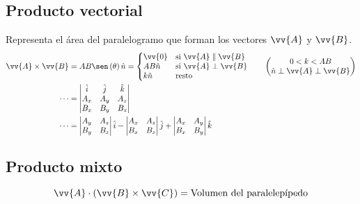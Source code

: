 \documentclass[a4paper, 8pt]{extarticle}
\renewcommand{\vec}[1]{\vv{{#1}}}
\begin{document}
\begin{multicols}{3}
  \subsection{Producto vectorial}
  Representa el área del paralelogramo que forman los vectores $\vec{A}$ y $\vec{B}$.
  \begin{align*}
    \vec{A} \times \vec{B} & = AB \sen \left( \theta \right) \hat{n} = \left\lbrace
    \begin{matrix*}[l]
      \vec{0} & \text{si } \vec{A} \parallel \vec{B}\\
      AB \hat{n} & \text{si }\vec{A} \perp \vec{B}\\
      k \hat{n}  & \text{resto}
    \end{matrix*} \right. \qquad
    \left( \begin{matrix}
               0 < k < AB \\
               \hat{n} \perp \vec{A} \perp \vec{B}
             \end{matrix} \right)                                       \\
    \cdots                 & =
    \begin{vmatrix}
      \hat{i} & \hat{j} & \hat{k} \\
      A_x     & A_y     & A_z     \\
      B_x     & B_y     & B_z     \\
    \end{vmatrix}                                                     \\
    \cdots                 & =
    \begin{vmatrix}
      A_y & A_z \\
      B_y & B_z \\
    \end{vmatrix} \hat{i} -
    \begin{vmatrix}
      A_x & A_z \\
      B_x & B_z \\
    \end{vmatrix} \hat{j} +
    \begin{vmatrix}
      A_x & A_y \\
      B_x & B_y \\
    \end{vmatrix} \hat{k}
  \end{align*}

  \subsection{Producto mixto}
  \[ \vec{A} \cdot \left( \vec{B} \times \vec{C} \right) = \text{Volumen del paralelepípedo} \]



\end{multicols}
\end{document}
